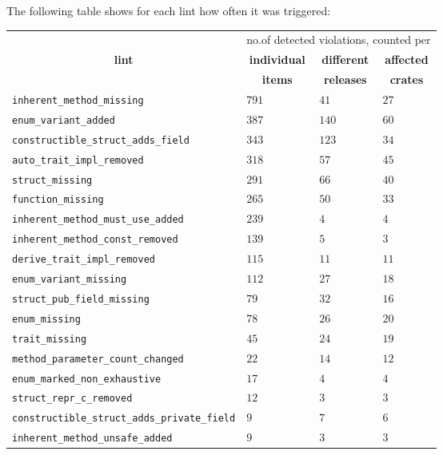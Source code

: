 \documentclass[licencjacka,en]{pracamgr}
\newcommand\Tspace{\rule{0pt}{2.6ex}}         %
\begin{document}
The following table shows for each lint how often it was triggered:

\begin{center}
	\begin{longtable}{| p{7.75cm} | p{1.975cm} | p{1.975cm} | p{1.975cm} |}
		\hline
			&
			\multicolumn{3}{c|}{no.\:of detected violations, counted per} \\
		\cline{2-4}
			\multicolumn{1}{|c|}{\textbf{lint}} &
			\multicolumn{1}{c|}{\textbf{individual}} &
			\multicolumn{1}{c|}{\textbf{different}} &
			\multicolumn{1}{c|}{\textbf{affected}} \Tspace \\
			&
			\multicolumn{1}{c|}{\textbf{items}} &
			\multicolumn{1}{c|}{\textbf{releases}} &
			\multicolumn{1}{c|}{\textbf{crates}} \\
		\hline
			\texttt{inherent\_method\_missing} & $791$ & $41$ & $27$ \Tspace \\
			\texttt{enum\_variant\_added} & $387$ & $140$ & $60$ \\
			\texttt{constructible\_struct\_adds\_field} & $343$ & $123$ & $34$ \\
			\texttt{auto\_trait\_impl\_removed} & $318$ & $57$ & $45$ \\
			\texttt{struct\_missing} & $291$ & $66$ & $40$ \\
			\texttt{function\_missing} & $265$ & $50$ & $33$ \\
			\texttt{inherent\_method\_must\_use\_added} & $239$ & $4$ & $4$ \\
			\texttt{inherent\_method\_const\_removed} & $139$ & $5$ & $3$ \\
			\texttt{derive\_trait\_impl\_removed} & $115$ & $11$ & $11$ \\
			\texttt{enum\_variant\_missing} & $112$ & $27$ & $18$ \\
			\texttt{struct\_pub\_field\_missing} & $79$ & $32$ & $16$ \\
			\texttt{enum\_missing} & $78$ & $26$ & $20$ \\
			\texttt{trait\_missing} & $45$ & $24$ & $19$ \\
			\texttt{method\_parameter\_count\_changed} & $22$ & $14$ & $12$ \\
			\texttt{enum\_marked\_non\_exhaustive} & $17$ & $4$ & $4$ \\
			\texttt{struct\_repr\_c\_removed} & $12$ & $3$ & $3$ \\
			\texttt{constructible\_struct\_adds\_private\_field} & $9$ & $7$ & $6$ \\
			\texttt{inherent\_method\_unsafe\_added} & $9$ & $3$ & $3$ \\

\end{longtable}
\end{center}
\end{document}
